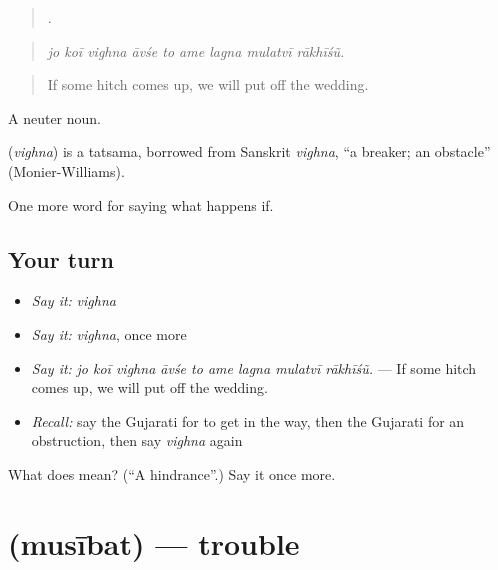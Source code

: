 \begin{quote}
        .
\end{quote}

\begin{quote}
\emph{jo koī vighna āvśe to ame lagna mulatvī rākhīśũ.}
\end{quote}

\begin{quote}
If some hitch comes up, we will put off the wedding.
\end{quote}

A neuter noun.

\begin{cousinweb}
\textbf{} (\emph{vighna}) is a tatsama, borrowed from Sanskrit \emph{vighna}, \textquotedblleft{}a breaker; an obstacle\textquotedblright{} (Monier-Williams).
\end{cousinweb}

\begin{grammarlens}[title={What you've built}]
One more word for saying what happens if.
\end{grammarlens}

\subsection*{Your turn}
\begin{itemize}
\raggedright
  \item \emph{Say it:} \emph{vighna}
  \item \emph{Say it:} \emph{vighna}, once more
  \item \emph{Say it:} \emph{jo koī vighna āvśe to ame lagna mulatvī rākhīśũ.} — If some hitch comes up, we will put off the wedding.
  \item \emph{Recall:} say the Gujarati for to get in the way, then the Gujarati for an obstruction, then say \emph{vighna} again
\end{itemize}

\begin{tcolorbox}[breakable,colback=teal!4,colframe=teal!35!black,title={Before you move on}]
What does  mean? (\textquotedblleft{}A hindrance\textquotedblright{}.) Say it once more.
\end{tcolorbox}
\section[\texorpdfstring{\gu{મુસીબત} (musībat)}{મુસીબત (musībat)}]{ (musībat) — trouble}

